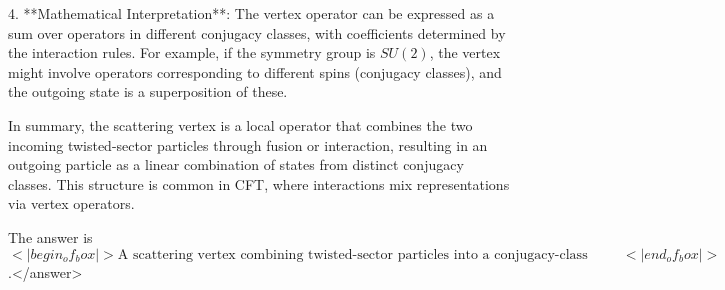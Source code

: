 4. **Mathematical Interpretation**: The vertex operator can be expressed as a sum over operators in different conjugacy classes, with coefficients determined by the interaction rules. For example, if the symmetry group is \( SU(2) \), the vertex might involve operators corresponding to different spins (conjugacy classes), and the outgoing state is a superposition of these.  

In summary, the scattering vertex is a local operator that combines the two incoming twisted-sector particles through fusion or interaction, resulting in an outgoing particle as a linear combination of states from distinct conjugacy classes. This structure is common in CFT, where interactions mix representations via vertex operators.  

The answer is \(<|begin_of_box|>\text{A scattering vertex combining twisted-sector particles into a conjugacy-class superposition}<|end_of_box|>\).</answer>